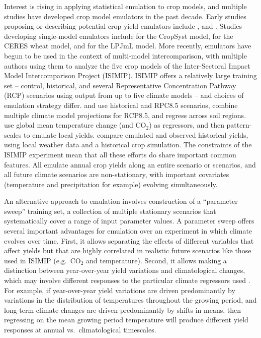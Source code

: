 \documentclass[gmd, manuscript]{copernicus} %
\begin{document}
Interest is rising in applying statistical emulation to crop models, and multiple studies have developed crop model emulators in the past decade.
Early studies proposing or describing potential crop yield emulators include \citet{Howden2005, raisen2006, Lobell2010}, and \citet{Ferrise2011}.  %
Studies developing single-model emulators include  \citet{Holzkamper2012} for the CropSyst model, \citet{RUANE2013a} for the CERES wheat model, and \citet{Oyebamiji15} for the LPJmL model. 
More recently, emulators have begun to be used in the context of multi-model intercomparison, with multiple authors \citep{BLANC2015, BLANC2017, Ostberg2018, Mistry2017}  using them to analyze the five crop models  of the Inter-Sectoral Impact Model Intercomparison Project (ISIMIP). ISIMIP offers a relatively large training set --  control, historical, and several Representative Concentration Pathway (RCP) scenarios using output from up to five climate models \citep{Warszawski3228, Frieler2017} -- and choices of emulation strategy differ.
\citet{BLANC2015} and \citet{BLANC2017} use historical and RPC8.5 scenarios, combine multiple climate model projections for RCP8.5, and regress across soil regions. 
\citet{Ostberg2018} use global mean temperature change (and CO$_2$) as regressors, and then pattern-scales to emulate local yields. 
\citet{Mistry2017} compare emulated and observed historical yields, using local weather data and a historical crop simulation. 
The constraints of the ISIMIP experiment mean that all these efforts do share important common features. 
All emulate annual crop yields along an entire scenario or scenarios, and all future climate scenarios are non-stationary, with important covariates (temperature and precipitation for example) evolving simultaneously. 

An alternative approach to emulation involves construction of a ``parameter sweep'' training set, a collection of multiple stationary scenarios that systematically cover a range of input parameter values.
A parameter sweep offers several important advantages for emulation over an experiment in which climate evolves over time. 
First, it allows separating the effects of different variables that affect yields but that are highly correlated in realistic future scenarios 
like those used in ISIMIP 
(e.g.\ CO$_2$ and temperature). 
Second, it allows making a distinction between year-over-year yield variations and climatological changes, which may involve different responses to the particular climate regressors used \citep[e.g.][]{Ruane2016}. 
For example, if year-over-year yield variations are driven predominantly by variations in the distribution of temperatures throughout the growing period, and long-term climate changes are driven predominantly by shifts in means, then regressing on the mean growing period temperature will produce different yield responses at annual vs.\ climatological timescales.  
\end{document}

